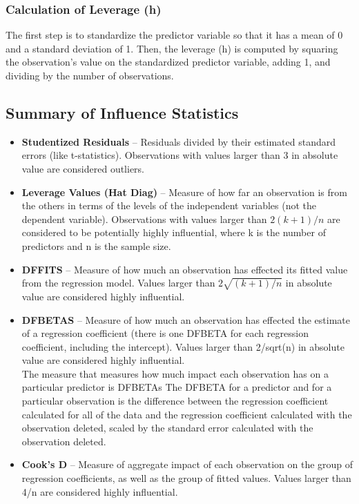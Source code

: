 \documentclass[Chap5amain.tex]{subfiles}
\begin{document}
\subsubsection{Calculation of Leverage (h)}
The first step is to standardize the predictor variable so that it has a mean of 0 and a standard deviation of 1. Then, the leverage (h) is computed by squaring the observation's value on the standardized predictor variable, adding 1, and dividing by the number of observations.


\subsection{Summary of Influence Statistics}
\begin{itemize}
\item	\textbf{Studentized Residuals} – Residuals divided by their estimated standard errors (like t-statistics). Observations with values larger than 3 in absolute value are considered outliers.
\item	\textbf{Leverage Values (Hat Diag)} – Measure of how far an observation is from the others in terms of the levels of the independent variables (not the dependent variable). Observations with values larger than $2(k+1)/n$ are considered to be potentially highly influential, where k is the number of predictors and n is the sample size.
\item	\textbf{DFFITS} – Measure of how much an observation has effected its fitted value from the regression model. Values larger than $2\sqrt{(k+1)/n}$ in absolute value are considered highly influential. %
\item	\textbf{DFBETAS} – Measure of how much an observation has effected the estimate of a regression coefficient (there is one DFBETA for each regression coefficient, including the intercept). Values larger than 2/sqrt(n) in absolute value are considered highly influential.
\\
The measure that measures how much impact each observation has on a particular predictor is DFBETAs The DFBETA for a predictor and for a particular observation is the difference between the regression coefficient calculated for all of the data and the regression coefficient calculated with the observation deleted, scaled by the standard error calculated with the observation deleted. 

\item	\textbf{Cook’s D} – Measure of aggregate impact of each observation on the group of regression coefficients, as well as the group of fitted values. Values larger than 4/n are considered highly influential.
\end{itemize}
\end{document}
